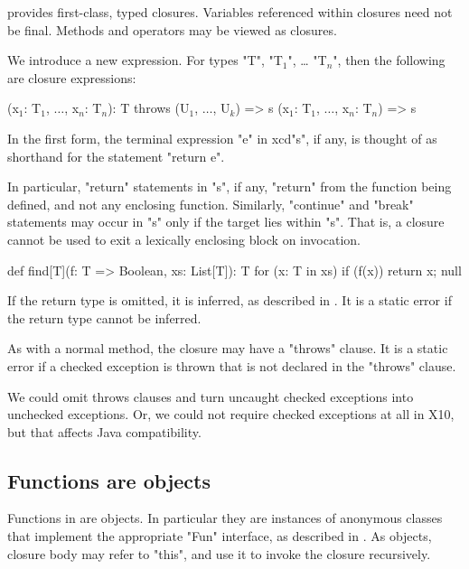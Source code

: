 \Xten{} provides first-class, typed closures.  Variables
referenced within closures need not be final.  Methods and
operators may be viewed as closures.

We introduce a new expression. For types \xcd"T",
\xcdmath"T$_1$", \dots
\xcdmath"T$_n$", then the following are closure expressions:

\begin{xtenmath}
(x$_1$: T$_1$, $\dots$, x$_n$: T$_n$): T throws (U$_1$, $\dots$, U$_k$) => { s }
(x$_1$: T$_1$, $\dots$, x$_n$: T$_n$) => { s }
\end{xtenmath}

In the first form, the terminal expression \xcd"e" in
xcd"s", if any, is thought of as shorthand for the statement
\xcd"return e".

In particular, \xcd"return" statements in \xcd"s", if any,
\xcd"return" from the function
being defined, and not any enclosing function. Similarly,
\xcd"continue" and
\xcd"break" statements may occur in \xcd"s" only if the target
lies within \xcd"s". That
is, a closure cannot be used to exit a lexically enclosing block on
invocation.

\begin{example}
\begin{xten}
def find[T](f: T => Boolean, xs: List[T]): T {
  for (x: T in xs)
    if (f(x)) return x;
  null
}
\end{xten}
\end{example}

If the return type is omitted, it is inferred, as described in
.
It is a static error if the return type cannot be inferred.

As with a normal method, the closure may have a \xcd"throws" clause. It is a
static error if a checked exception is thrown that is not declared in
the \xcd"throws" clause.

\begin{note}
We could omit throws clauses and turn uncaught checked
exceptions into unchecked exceptions. Or, we could not require checked
exceptions at all in X10, but that affects Java compatibility.
\end{note}

\subsection{Functions are objects}

Functions in \Xten{} are objects.  In particular they are
instances of anonymous classes that implement the appropriate
\xcd"Fun" interface, as described in .
As objects, closure body may refer to
\xcd"this", and use it to invoke the closure recursively.

